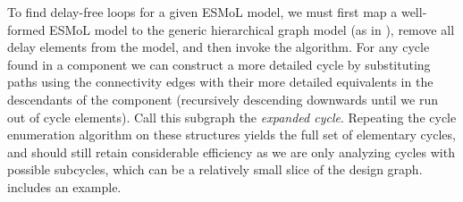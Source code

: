 %

%

To find delay-free loops for a given ESMoL model, we must first map a well-formed ESMoL model to the generic hierarchical graph model (as in \cite{modeling:esmol_cycles_tr}), remove all delay elements from the model, and  then invoke the algorithm.  For any cycle found in a component we can construct a more detailed cycle by substituting paths using the connectivity edges with their more detailed equivalents in the descendants of the component (recursively descending downwards until we run out of cycle elements).  Call this subgraph the \emph{expanded cycle}.  Repeating the cycle enumeration algorithm on these structures yields the full set of elementary cycles, and should still retain considerable efficiency as we are only analyzing cycles with possible subcycles, which can be a relatively small slice of the design graph.  \cite{modeling:esmol_cycles_tr} includes an example.
